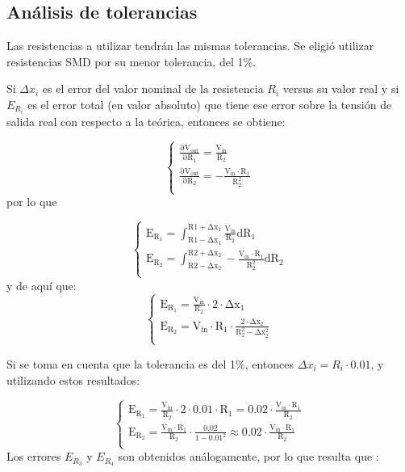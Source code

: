 \documentclass[../../tc_tp3_main.tex]{subfiles}
\begin{document}
\subsection{Análisis de tolerancias}
Las resistencias a utilizar tendrán las mismas tolerancias. Se eligió utilizar resistencias SMD por su menor tolerancia, del 1\%. \par
Si $\Delta x_i$ es el error del valor nominal de la resistencia $R_i$ versus su valor real y si $E_{R_i}$ es el error total (en valor absoluto) que tiene ese error sobre la tensión de salida real con respecto a la teórica, entonces se obtiene:

 	\begin{equation}
  	   \left\{
	  	    \begin{array}{ll}
		 					\mathrm{\frac{\partial V_{out}}{\partial R_1} = \frac{V_{in}}{R_2}} \\
			 				\mathrm{\frac{\partial V_{out}}{\partial R_2} = -\frac{V_{in} \cdot R_1}{R_2^2} } \\
	     	 \end{array}
	     	\right.
 	\end{equation}
por lo que 

 	\begin{equation}
  	   \left\{
	  	    \begin{array}{ll}
		 					\mathrm{E_{R_1} = \int_{R1 - \Delta x_1}^{R1 + \Delta x_1} {\frac{V_{in}}{R_2} dR_1}  }\\
			 				\mathrm{E_{R_2} =  \int_{R2 - \Delta x_2}^{R2 + \Delta x_2} -\frac{V_{in} \cdot R_1}{R_2^2} dR_2 }  \\
	     	 \end{array}
	     	\right.
 	\end{equation}
y de aquí que:
 	\begin{equation}
  	   \left\{
	  	    \begin{array}{ll}
		 					\mathrm{E_{R_1} = \frac{V_{in}}{R_2} \cdot 2\cdot \Delta x_1}\\
			 				\mathrm{E_{R_2} =  V_{in} \cdot R_1\cdot \frac{2\cdot \Delta x_2}{R_2^2-\Delta x_2^2}}  \\
	     	 \end{array}
	     	\right.
 	\end{equation}
 	
 	Si se toma en cuenta que la tolerancia es del 1\%, entonces $\Delta x_i = R_i \cdot 0.01$, y utilizando estos resultados:
 	
 	 	\begin{equation}
  	   \left\{
	  	    \begin{array}{ll}
		 					\mathrm{E_{R_1} = \frac{V_{in}}{R_2} \cdot 2\cdot 0.01 \cdot R_1 = 0.02 \cdot \frac{V_{in}\cdot R_1}{R_2}}\\
			 				\mathrm{E_{R_2} =  \frac{V_{in} \cdot R_1}{R_2}\cdot \frac{0.02}{1-0.01^2} \approx 0.02 \cdot \frac{V_{in} \cdot R_1}{R_2}}  \\
	     	 \end{array}
	     	\right.
 	\end{equation}
Los errores $E_{R_3}$ y $E_{R_4}$ son obtenidos análogamente, por lo que resulta que :
\end{document}
